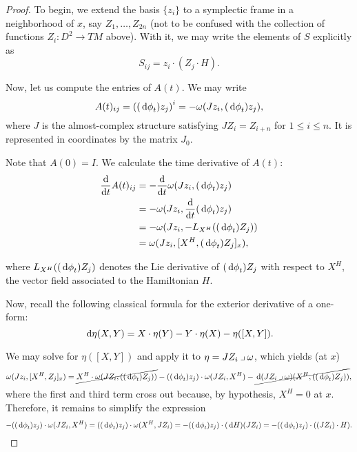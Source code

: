 \begin{proof}
To begin, we extend the basis $\{z_i\}$ to a symplectic frame in a neighborhood of $x$, say $Z_1, \dots, Z_{2n}$ (not to be confused with the collection of functions $Z_i \colon D^2 \to TM$ above). With it, we may write the elements of $S$ explicitly as
\begin{equation}
S_{ij} = z_i \cdot (Z_j \cdot H).
\end{equation}

Now, let us compute the entries of $A(t)$. We may write
\begin{equation}
A(t)_{ij} = \left((\dl \phi_t) z_j \right)^i = -\omega(J z_i, (\dl \phi_t) z_j),
\end{equation}
where $J$ is the almost-complex structure satisfying $J Z_i = Z_{i+n}$ for $1 \leq i \leq n$. It is represented in coordinates by the matrix $J_0$.

Note that $A(0) = I$. We calculate the time derivative of $A(t)$:
\begin{equation}
\begin{aligned}
\diff*{A(t)_{ij}}t &= - \diff*{\omega(J z_i, (\dl \phi_t) z_j)}t\\
&= - \omega(J z_i, \diff*{(\dl \phi_t) z_j}t)\\
&= - \omega(J z_i, - \Lie_{X^H} ((\dl \phi_t) Z_j))\\
&= \omega(J z_i, [X^H,(\dl \phi_t) Z_j]_x),
\end{aligned}
\end{equation}

where $\Lie_{X^H} ((\dl \phi_t)Z_j)$ denotes the Lie derivative of $(\dl \phi_t)Z_j$ with respect to $X^H$, the vector field associated to the Hamiltonian $H$.

Now, recall the following classical formula for the exterior derivative of a one-form:
\begin{equation}
\dl \eta(X,Y) = X \cdot \eta(Y) - Y \cdot \eta(X) - \eta([X,Y]).
\end{equation}

We may solve for $\eta([X,Y])$ and apply it to $\eta = J Z_i \mathbin{\lrcorner} \omega$, which yields (at $x$)
\begin{equation}
\omega(J z_i, [X^H, Z_j]_x) = \cancel{X^H \cdot \omega(J Z_i, ((\dl \phi_t)Z_j))} - ((\dl \phi_t) z_j) \cdot \omega(J Z_i, X^H) - \cancel{\dl(J Z_i \into \omega)(X^H, ((\dl \phi_t)Z_j))},
\end{equation}
where the first and third term cross out because, by hypothesis, $X^H = 0$ at $x$. Therefore, it remains to simplify the expression
\begin{equation}
- ((\dl \phi_t) z_j) \cdot \omega(J Z_i, X^H) = ((\dl \phi_t) z_j) \cdot \omega(X^H, J Z_i) = - ((\dl \phi_t) z_j) \cdot (\dl H)(J Z_i) = - ((\dl \phi_t) z_j) \cdot ((J Z_i) \cdot H).
\end{equation}


\end{proof}
